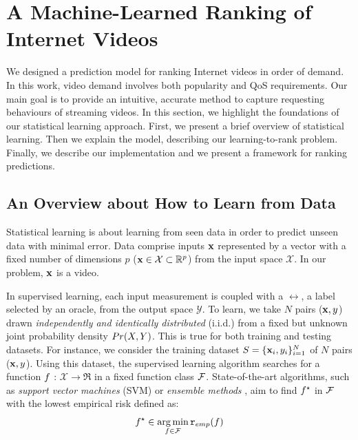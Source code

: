 \section{A Machine-Learned Ranking of Internet Videos}
\label{sec:learning_model}

We designed a prediction model for ranking Internet videos in order of demand. In this work, video demand involves both popularity and QoS requirements. Our main goal is to provide an intuitive, accurate method to capture requesting behaviours of streaming videos. In this section, we highlight the foundations of our statistical learning approach. First, we present a brief overview of statistical learning. Then we explain the model, describing our learning-to-rank problem. Finally, we describe our implementation and we present a framework for ranking predictions.

\subsection{An Overview about How to Learn from Data}
\label{subsec:learning_model_overview}

Statistical learning is about learning from seen data in order to predict unseen data with minimal error. Data comprise inputs ${\bf x}$ represented by a vector with a fixed
  number of dimensions $p$ (${\bf x} \in {\cal X} \subset \mathbb{R}^p$) from the input space $\mathcal{X}$. In our problem, ${\bf x}$ is a video. 

In supervised learning, each input measurement is coupled with a $\rel$, a label selected by an oracle, from the output space $\mathcal{Y}$. To learn, we take $N$ pairs (${\bf x},y$) drawn \emph{independently and identically distributed} (i.i.d.) from a fixed but unknown joint probability density ${Pr(X,Y)}$. This is true  for both training and testing datasets. For instance, we consider the training dataset  $S = \{{\bf x}_i,y_i\}_{i=1}^N$ of $N$ pairs (${\bf x},y$). Using this dataset, the supervised learning algorithm searches for a function $f$ : $\mathcal{X} \rightarrow \Re$  in a fixed function class ${\cal F}$. State-of-the-art algorithms, such as \emph{support vector machines} (\textsc{SVM}) \cite{svm_1995} or \emph{ensemble methods} \cite{elements_of_statistical_learning_2001}, aim to find $f^\star$ in ${\cal F}$ with the lowest empirical risk defined as:
\begin{equation}
\label{eq:erm}
f^\star \in \operatorname*{arg\,min}_{f \in {\cal F}} {\tt r}_{emp}(f)
\end{equation}

